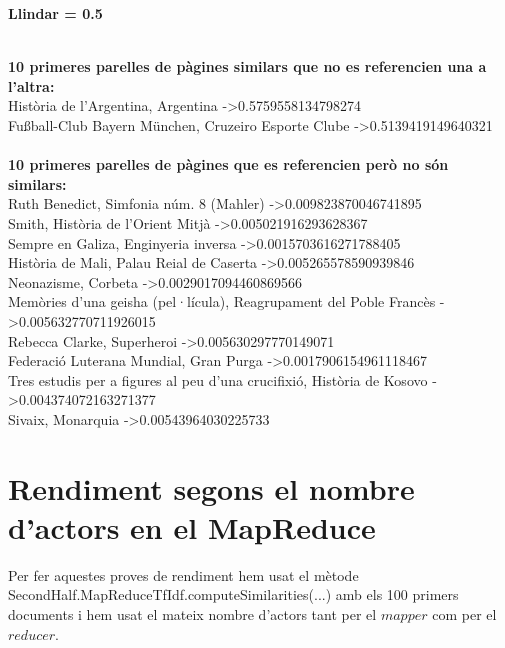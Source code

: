\documentclass[11pt,a4paper,twoside]{report}
\begin{document}
\newline
\centerline{ \textbf{Llindar = 0.5} }
\newline
 \\ 
\textbf{10 primeres parelles de pàgines similars que no es referencien una a l'altra:} \\ 
Història de l'Argentina, Argentina -\textgreater 0.5759558134798274 \\ 
Fußball-Club Bayern München, Cruzeiro Esporte Clube -\textgreater 0.5139419149640321 \\ 
 \\ 
\textbf{10 primeres parelles de pàgines que es referencien però no són similars:} \\ 
Ruth Benedict, Simfonia núm. 8 (Mahler) -\textgreater 0.009823870046741895 \\ 
Smith, Història de l'Orient Mitjà -\textgreater 0.005021916293628367 \\ 
Sempre en Galiza, Enginyeria inversa -\textgreater 0.0015703616271788405 \\ 
Història de Mali, Palau Reial de Caserta -\textgreater 0.005265578590939846 \\ 
Neonazisme, Corbeta -\textgreater 0.0029017094460869566 \\ 
Memòries d'una geisha (pel·lícula), Reagrupament del Poble Francès -\textgreater 0.005632770711926015 \\ 
Rebecca Clarke, Superheroi -\textgreater 0.005630297770149071 \\ 
Federació Luterana Mundial, Gran Purga -\textgreater 0.0017906154961118467 \\ 
Tres estudis per a figures al peu d'una crucifixió, Història de Kosovo -\textgreater 0.004374072163271377 \\ 
Sivaix, Monarquia -\textgreater 0.00543964030225733 \\

\newpage
\section{Rendiment segons el nombre d'actors en el MapReduce}

Per fer aquestes proves de rendiment hem usat el mètode SecondHalf.MapReduceTfIdf.computeSimilarities(...) amb els 100 primers documents i hem usat el mateix nombre d'actors tant per el $mapper$ com per el $reducer$.
\end{document}
